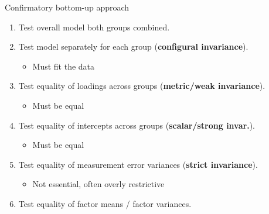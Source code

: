 \documentclass[10pt]{beamer}\usepackage[]{graphicx}\usepackage[]{xcolor}
\begin{document}
%
\begin{frame}[fragile]{Confirmatory bottom-up approach}
\begin{enumerate}
    \item Test overall model both groups combined.
    \item Test model separately for each group (\textbf{configural invariance}).
    \begin{itemize}
        \item Must fit the data
    \end{itemize}
    \item Test equality of loadings across groups (\textbf{metric/weak invariance}).
    \begin{itemize}
        \item Must be equal
    \end{itemize}
    \item Test equality of intercepts across groups (\textbf{scalar/strong invar.}).
    \begin{itemize}
        \item Must be equal
    \end{itemize}
    \item Test equality of measurement error variances (\textbf{strict invariance}).
    \begin{itemize}
        \item Not essential, often overly restrictive
    \end{itemize}
    \item Test equality of factor means / factor variances.
\end{enumerate}

\end{frame}
%
\end{document}
